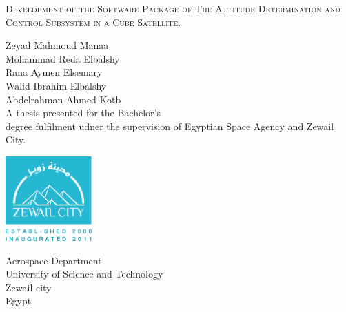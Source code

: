 \begin{titlepage}
    \begin{center}
        \vspace*{2cm}
        
        \Large
        \textsc{Development of the Software Package of The Attitude Determination and Control Subsystem in a Cube Satellite.}
        
        
        \vspace*{1.5cm}
        \normal
        
        {Zeyad Mahmoud Manaa}\\
        {Mohammad Reda Elbalshy}\\
        {Rana Aymen Elsemary}\\
        {Walid Ibrahim Elbalshy}\\
        {Abdelrahman Ahmed Kotb}\\
        
        
        \vspace{1.5cm}
        \normal
        A thesis presented for the Bachelor's\\
        degree fulfilment udner the supervision of Egyptian Space Agency and Zewail City.
        
        \vspace{1.5cm}
        
		\includegraphics[width=1.3in]{Figures/logo city.pdf}
        
        \Large
        Aerospace Department\\
        University of Science and Technology \\
    	Zewail city\\
        Egypt\\
        
    \end{center}
\end{titlepage}